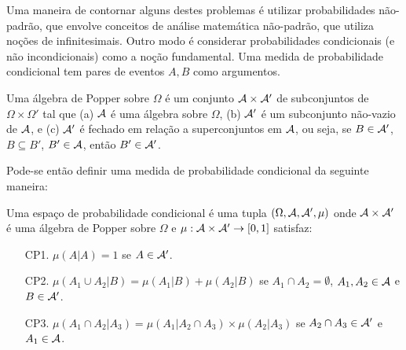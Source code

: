 \begin{frame}

Uma maneira de contornar alguns destes problemas é utilizar probabilidades não-padrão, que envolve conceitos de análise matemática não-padrão, que utiliza noções de infinitesimais. Outro modo é considerar probabilidades condicionais (e não
incondicionais) como a noção fundamental. Uma medida
de probabilidade condicional tem pares de eventos $A,B$ como
argumentos.

\begin{defi}
Uma álgebra de Popper sobre $\Omega$ é um conjunto ${\cal A}\times {\cal A}'$ de
subconjuntos de $\Omega\times \Omega'$ tal que (a) ${\cal A}$ é uma
álgebra sobre $\Omega$, (b) ${\cal A}'$ é um subconjunto não-vazio de
${\cal A}$, e (c) ${\cal A}'$ é fechado em relação a superconjuntos em ${\cal A}$, ou
seja, se $B\in{\cal A}'$, $B\subseteq B'$, $B'\in{\cal A}$, então $B'\in{\cal A}'$.
\end{defi}

Pode-se então definir uma medida de probabilidade condicional da
seguinte maneira:
\begin{defi}
	Uma espaço de probabilidade condicional é uma tupla
	$(\Omega,{\cal A},{\cal A}',\mu)$ onde ${\cal A}\times {\cal A}'$ é uma álgebra de Popper
	sobre $\Omega$ e $\mu:{\cal A}\times {\cal A}'\rightarrow [0,1]$ satisfaz:
	\begin{enumerate}
		\item[CP1.] $\mu(A|A)=1$ se $A\in{\cal A}'$.
		
		\item[CP2.] $\mu(A_1\cup A_2|B)=\mu(A_1|B)+\mu(A_2|B)$ se $A_1\cap
		A_2=\emptyset$, $A_1,A_2\in{\cal A}$ e $B\in{\cal A}'$.
		
		\item[CP3.] $\mu(A_1\cap A_2|A_3)=\mu(A_1|A_2\cap A_3)\times
		\mu(A_2|A_3)$ se $A_2\cap A_3\in {\cal A}'$ e $A_1\in{\cal A}$.
	\end{enumerate}
\end{defi}
\end{frame}

